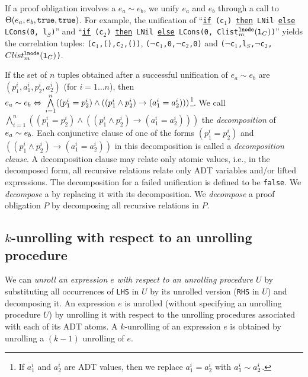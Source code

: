 If a proof obligation involves a \recursiveRelation{}
$e_a\sim{}e_b$, we unify $e_a$ and $e_b$
through a call to $\Theta(e_a, e_b, {\tt true}, {\tt true})$.
For example,
the unification of ``{\tt \underline{if} (c$_1$) \underline{then} LNil \underline{else} LCons(0, l$_S$)}'' and
``{\tt \underline{if} (c$_2$) \underline{then} LNil \underline{else} LCons(0, {\tt Clist$^{{\tt lnode}}_m({\tt l}_C)$})}''
yields the correlation
tuples: {\tt (c$_1$,(),c$_2$,())}, {\tt ($\neg$c$_1$,0,$\neg$c$_2$,0)} and {\tt ($\neg$c$_1$,l$_S$,$\neg$c$_2$,$Clist^{{\tt lnode}}_m({\tt l}_C)$)}.

If the set of $n$ tuples obtained
after a successful unification
of $e_a\sim{}e_b$
are $(p^i_1, a^i_1, p^i_2, a^i_2)$ (for $i=1\ldots{}n$), then
$e_a\sim{}e_b \Leftrightarrow{} \bigwedge\limits_{i=1}^n((p^i_1=p^i_2) \land ((p^i_1\land{}p^i_2)\rightarrow{}(a^i_1=a^i_2)))$\footnote{If $a^i_1$ and $a^i_2$ are ADT values, then we replace $a^i_1=a^i_2$ with $a^i_1\sim{}a^i_2$.}.
We call
$\bigwedge\limits_{i=1}^n((p^i_1=p^i_2) \land ((p^i_1\land{}p^i_2)\rightarrow{}(a^i_1=a^i_2)))$
the {\em decomposition}
of $e_a\sim{}e_b$.
Each conjunctive clause of one of the forms $(p^i_1=p^i_2)$ and $((p^i_1\land{}p^i_2)\rightarrow{}(a^i_1=a^i_2))$ in
this decomposition is called a {\em decomposition clause}.
A decomposition clause may relate only atomic values, i.e.,
in the decomposed form, all recursive relations
relate only ADT variables and/or lifted expressions.
The decomposition for a failed unification is defined to be {\tt false}.
We {\em decompose}
a \recursiveRelation{} by replacing it with its
decomposition.
We {\em decompose} a proof obligation $P$ by
decomposing all recursive relations in $P$.

\subsection{$k$-unrolling with respect to an unrolling procedure}
We can {\em unroll an expression $e$ with respect to an unrolling
procedure $U$}
by substituting all occurrences
of {\tt LHS} in $U$ by its
unrolled version ({\tt RHS} in $U$) and decomposing it.
An expression $e$ is unrolled (without specifying
an unrolling procedure $U$) by unrolling it with respect
to the unrolling procedures associated with each of its ADT atoms.
A $k$-unrolling of an expression $e$
is obtained by unrolling a $(k-1)$ unrolling of $e$.

